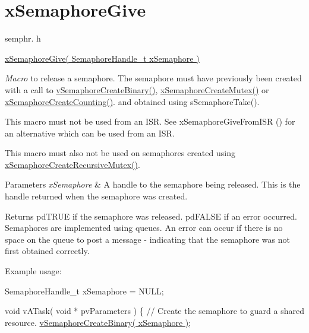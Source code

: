 \hypertarget{group__x_semaphore_give}{}\section{x\+Semaphore\+Give}
\label{group__x_semaphore_give}
semphr. h 
\begin{DoxyPre}\hyperlink{semphr_8h_aae55761cabfa9bf85c8f4430f78c0953}{xSemaphoreGive( SemaphoreHandle\_t xSemaphore )}\end{DoxyPre}


{\itshape Macro} to release a semaphore. The semaphore must have previously been created with a call to \hyperlink{semphr_8h_ae10bffadd26fbd5bcce76bf33a83ef30}{v\+Semaphore\+Create\+Binary()}, \hyperlink{semphr_8h_aa6a00aa9b91a9e5b3ebe4ae1c3f115c6}{x\+Semaphore\+Create\+Mutex()} or \hyperlink{semphr_8h_a7764616a918a46115403569a88148ad4}{x\+Semaphore\+Create\+Counting()}. and obtained using s\+Semaphore\+Take().

This macro must not be used from an I\+SR. See x\+Semaphore\+Give\+From\+I\+SR () for an alternative which can be used from an I\+SR.

This macro must also not be used on semaphores created using \hyperlink{semphr_8h_a1bbc843be5a41ea83d2693b2189fc0f8}{x\+Semaphore\+Create\+Recursive\+Mutex()}.


\begin{DoxyParams}{Parameters}
{\em x\+Semaphore} & A handle to the semaphore being released. This is the handle returned when the semaphore was created.\\
\hline
\end{DoxyParams}
\begin{DoxyReturn}{Returns}
pd\+T\+R\+UE if the semaphore was released. pd\+F\+A\+L\+SE if an error occurred. Semaphores are implemented using queues. An error can occur if there is no space on the queue to post a message -\/ indicating that the semaphore was not first obtained correctly.
\end{DoxyReturn}
Example usage\+: 
\begin{DoxyPre}
SemaphoreHandle\_t xSemaphore = NULL;\end{DoxyPre}



\begin{DoxyPre}void vATask( void * pvParameters )
\{
   // Create the semaphore to guard a shared resource.
   \hyperlink{semphr_8h_ae10bffadd26fbd5bcce76bf33a83ef30}{vSemaphoreCreateBinary( xSemaphore )};\end{DoxyPre}



